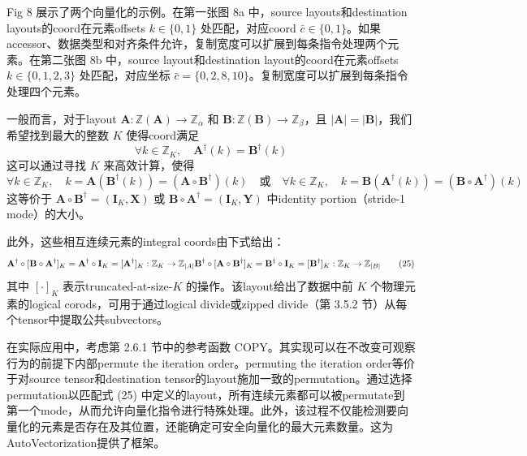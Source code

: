 \documentclass{article}
\begin{document}
Fig 8 展示了两个向量化的示例。在第一张图 8a 中，source layouts和destination layouts的coord在元素offsets \(k \in \{0, 1\}\) 处匹配，对应coord \(\bar{c} \in \{0, 1\}\)。如果accessor、数据类型和对齐条件允许，复制宽度可以扩展到每条指令处理两个元素。在第二张图 8b 中，source layout和destination layout的coord在元素offsets \(k \in \{0, 1, 2, 3\}\) 处匹配，对应坐标 \(\bar{c} = \{0, 2, 8, 10\}\)。复制宽度可以扩展到每条指令处理四个元素。

一般而言，对于layout \(\mathbf{A} : \mathbb{Z}(\mathbf{A}) \to \mathbb{Z}_\alpha\) 和 \(\mathbf{B} : \mathbb{Z}(\mathbf{B}) \to \mathbb{Z}_\beta\)，且 \(|\mathbf{A}| = |\mathbf{B}|\)，我们希望找到最大的整数 \(K\) 使得coord满足
\[
\forall k \in \mathbb{Z}_K, \quad \mathbf{A}^\dagger(k) = \mathbf{B}^\dagger(k)
\]
这可以通过寻找 \(K\) 来高效计算，使得
\[
\forall k \in \mathbb{Z}_K, \quad k = \mathbf{A}(\mathbf{B}^\dagger(k)) = (\mathbf{A} \circ \mathbf{B}^\dagger)(k) \quad \text{或} \quad \forall k \in \mathbb{Z}_K, \quad k = \mathbf{B}(\mathbf{A}^\dagger(k)) = (\mathbf{B} \circ \mathbf{A}^\dagger)(k)
\]
这等价于 \(\mathbf{A} \circ \mathbf{B}^\dagger = (\mathbf{I}_K, \mathbf{X})\) 或 \(\mathbf{B} \circ \mathbf{A}^\dagger = (\mathbf{I}_K, \mathbf{Y})\) 中identity portion（stride-1 mode）的大小。

此外，这些相互连续元素的integral coords由下式给出：
\[
\mathbf{A}^\dagger \circ [\mathbf{B} \circ \mathbf{A}^\dagger]_{K} = \mathbf{A}^\dagger \circ \mathbf{I}_K = [\mathbf{A}^\dagger]_{K} : \mathbb{Z}_K \to \mathbb{Z}_{|A|} \\
\mathbf{B}^\dagger \circ [\mathbf{A} \circ \mathbf{B}^\dagger]_{K} = \mathbf{B}^\dagger \circ \mathbf{I}_K = [\mathbf{B}^\dagger]_{K} : \mathbb{Z}_K \to \mathbb{Z}_{|B|} \tag{25}
\]
其中 \([\cdot]_{K}\) 表示truncated-at-size-\(K\) 的操作。该layout给出了数据中前 \(K\) 个物理元素的logical corods，可用于通过logical divide或zipped divide（第 3.5.2 节）从每个tensor中提取公共subvectors。

在实际应用中，考虑第 2.6.1 节中的参考函数 COPY。其实现可以在不改变可观察行为的前提下内部permute the iteration order。permuting the iteration order等价于对source tensor和destination tensor的layout施加一致的permutation。通过选择permutation以匹配式 (25) 中定义的layout，所有连续元素都可以被permutate到第一个mode，从而允许向量化指令进行特殊处理。此外，该过程不仅能检测要向量化的元素是否存在及其位置，还能确定可安全向量化的最大元素数量。这为AutoVectorization提供了框架。
\end{document}
